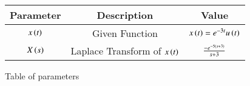 \renewcommand\thetable{1}
\begin{tabular}{|c|c|c|}
    \hline 
    \textbf{Parameter}&\textbf{Description} &\textbf{Value}\\
    \hline
    $x\left(t\right)$ & Given Function & $x\left(t\right) = e^{-3t}u\left(t\right)$ \\
    \hline
	$X\left(s\right)$ & Laplace Transform of $x\left(t\right)$ & $\frac{-e^{-5\left(s + 3\right)}}{s + 3}$ \\
    \hline
\end{tabular}

\caption{Table of parameters}
\label{Table:1}

